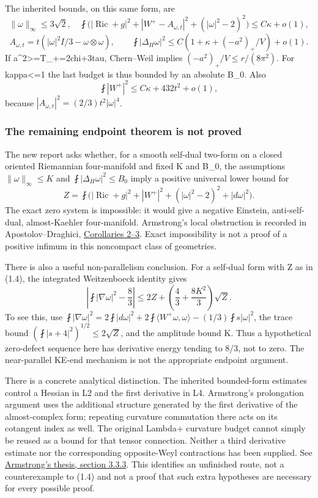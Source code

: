 \documentclass[
  10pt,
]{article}
\begin{document}
The inherited bounds, on this same form, are \[
 \|\omega\|_\infty\le3\sqrt2,\quad
 \fint\bigl(|\operatorname{Ric}+g|^2+|W^+-A_{\omega,t}|^2
                    +( |\omega|^2-2)^2\bigr)\le C\kappa+o(1),
\] \[
 A_{\omega,t}=t(|\omega|^2I/3-\omega\otimes\omega),\qquad
 \fint|\Delta_H\omega|^2\le C(1+\kappa+(-a^2)_+/V)+o(1).    \tag{1.2}
\] If a\^{}2\textgreater=T\_+=2chi+3tau, Chern--Weil implies
\((-a^2)_+/V\le r/(8\pi^2)\). For kappa\textless=1 the last budget is
thus bounded by an absolute B\_0. Also \[
 \fint|W^+|^2\le C\kappa+432t^2+o(1),                    \tag{1.3}
\] because \(|A_{\omega,t}|^2=(2/3)t^2|\omega|^4\).

\hypertarget{the-remaining-endpoint-theorem-is-not-proved}{%
\subsubsection{The remaining endpoint theorem is not
proved}\label{the-remaining-endpoint-theorem-is-not-proved}}

The new report asks whether, for a smooth self-dual two-form on a closed
oriented Riemannian four-manifold and fixed K and B\_0, the assumptions
\(\|\omega\|_\infty\le K\) and \(\fint|\Delta_H\omega|^2\le B_0\) imply
a positive universal lower bound for \[
 Z=\fint\bigl(|\operatorname{Ric}+g|^2+|W^+|^2
                     +( |\omega|^2-2)^2+|d\omega|^2\bigr). \tag{1.4}
\] The exact zero system is impossible: it would give a negative
Einstein, anti-self-dual, almost-Kaehler four-manifold. Armstrong's
local obstruction is recorded in Apostolov--Draghici,
\href{https://arxiv.org/pdf/math/0302152}{Corollaries 2--3}. Exact
impossibility is not a proof of a positive infimum in this noncompact
class of geometries.

There is also a useful non-parallelism conclusion. For a self-dual form
with Z as in (1.4), the integrated Weitzenboeck identity gives \[
 \left|\fint|\nabla\omega|^2-\frac83\right|
 \le2Z+\left(\frac43+\frac{8K^2}{3}\right)\sqrt Z.         \tag{1.5}
\] To see this, use
\(\fint|\nabla\omega|^2=2\fint|d\omega|^2+ 2\fint\langle W^+\omega,\omega\rangle-(1/3)\fint s|\omega|^2\),
the trace bound \((\fint|s+4|^2)^{1/2}\le2\sqrt Z\), and the amplitude
bound K. Thus a hypothetical zero-defect sequence here has derivative
energy tending to 8/3, not to zero. The near-parallel KE-end mechanism
is not the appropriate endpoint argument.

There is a concrete analytical distinction. The inherited bounded-form
estimates control a Hessian in L2 and the first derivative in L4.
Armstrong's prolongation argument uses the additional structure
generated by the first derivative of the almost-complex form; repeating
curvature commutation there acts on its cotangent index as well. The
original Lambda+ curvature budget cannot simply be reused as a bound for
that tensor connection. Neither a third derivative estimate nor the
corresponding opposite-Weyl contractions has been supplied. See
\href{https://johnarmstrongmaths.com/publications/resources/thesis.pdf}{Armstrong's
thesis, section 3.3.3}. This identifies an unfinished route, not a
counterexample to (1.4) and not a proof that such extra hypotheses are
necessary for every possible proof.
\end{document}

